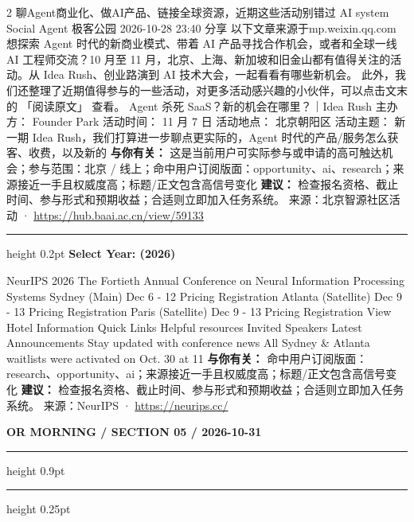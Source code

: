 \documentclass[10.5pt]{ctexart}
\begin{document}
\begin{multicols}{2}
聊Agent商业化、做AI产品、链接全球资源，近期这些活动别错过 AI system Social Agent 极客公园 2026-10-28 23:40 分享 以下文章来源于mp.weixin.qq.com 想探索 Agent 时代的新商业模式、带着 AI 产品寻找合作机会，或者和全球一线 AI 工程师交流？10 月至 11 月，北京、上海、新加坡和旧金山都有值得关注的活 动。从 Idea Rush、创业路演到 AI 技术大会，一起看看有哪些新机会。 此外，我们还整理了近期值得参与的一些活动，对更多活动感兴趣的小伙伴，可以点击文末的 「阅读原文」 查看。 Agent 杀死 SaaS？新的机会在哪里？｜Idea Rush 主办方： Founder Park 活动时间： 11 月 7 日 活动地点： 北京朝阳区 活动主题： 新一期 Idea Rush，我们打算进一步聊点更实际的，Agent 时代的产品/服务怎么获客、收费，以及新的
\textbf{与你有关：} 这是当前用户可实际参与或申请的高可触达机会；参与范围：北京 / 线上；命中用户订阅版面：opportunity、ai、research；来源接近一手且权威度高；标题/正文包含高信号变化
\textbf{建议：} 检查报名资格、截止时间、参与形式和预期收益；合适则立即加入任务系统。
{\footnotesize\color{ormuted} 来源：北京智源社区活动 · \url{https://hub.baai.ac.cn/view/59133}}
\vspace{2mm}
\hrule height 0.2pt
\vspace{2mm}
{\large\bfseries Select Year: (2026)}\par
NeurIPS 2026 The Fortieth Annual Conference on Neural Information Processing Systems Sydney (Main) Dec 6 - 12 Pricing Registration Atlanta (Satellite) Dec 9 - 13 Pricing Registration Paris (Satellite) Dec 9 - 13 Pricing Registration View Hotel Information Quick Links Helpful resources Invited Speakers Latest Announcements Stay updated with conference news All Sydney \& Atlanta waitlists were activated on Oct. 30 at 11
\textbf{与你有关：} 命中用户订阅版面：research、opportunity、ai；来源接近一手且权威度高；标题/正文包含高信号变化
\textbf{建议：} 检查报名资格、截止时间、参与形式和预期收益；合适则立即加入任务系统。
{\footnotesize\color{ormuted} 来源：NeurIPS · \url{https://neurips.cc/}}
\end{multicols}
\newpage
{\small\bfseries OR MORNING / SECTION 05 / 2026-10-31}
\vspace{2mm}
\hrule height 0.9pt
\vspace{1.5mm}
\hrule height 0.25pt
\vspace{4mm}
\end{document}
